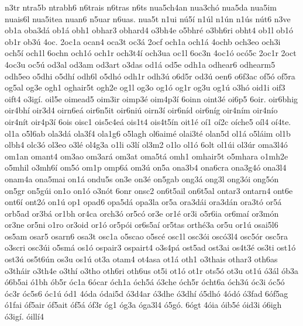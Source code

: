 {n3tr
ntra5b
ntrabh6
n6trais
n6tras
n6ts
nua5ch4an
nua3ch^^f3
nua5da
nua5im
nuais6l
nua5itea
nuan6
n5uar
n6uas.
nua5t
n1ui
n^^fa5^^ed
n1^^fal
n1^^fan
n1^^fas
n^^fat6
n3ve
ob1a
oba3d^^e1
ob1^^e1
obh1
obhar3
obhard4
o3bh4e
o5bhr^^e9
o3bh6ri
obht4
ob1l
ob1^^f3
ob1r
ob3^^fa
4oc.
2oc1a
ocan4
oca3t
oc3^^e1
2ocf
och1a
och1^^e1
4ochb
och3eo
och3i
och5^^ed
och1l
6ochn
och1^^f3
och1r
och3t4^^ed
och3ua
oc1l
6oc3n
4oc1^^f3
oc^^f35c
2oc1r
2oct
4oc3u
oc5^^fa
od3al
od3am
od3art
o3das
od1^^e1
od5e
odh1a
odhear6
odhearm5
odh5eo
o5dhi
o5dh^^ed
odh6l
o5dh^^f3
odh1r
odh3^^fa
o6d5r
od3^^fa
oen6
o6f3ac
of5^^f3
of5ra
og5al
og3e
ogh1
oghair5t
ogh2e
og1l
og3o
og1^^f3
og1r
og3u
og1^^fa
o3h^^f3
oid1i
oif3
oift4
o3ig^^ed.
oil5e
oimead5
oim3ir
oimp3^^e9
oim4p3^^ed
6oinn
oint3^^e9
oi6p5
6oir.
oir6bhig
oir4bh^^ed
oir3d4
oirn6e^^e1
oir6n5it
oir6ni^^fa
oirn3^^ed
oir6n^^edd
oir6n^^edg
oir4n^^edm
oir4n^^edo
oir4n^^edt
oir4p3^^ed
6ois
oisc1
ois5c4e^^e1
ois1t4
ois4t5^^edn
oit1^^e9
o^^ed1
o^^ed2c
o^^edche5
o^^edl4
o^^ed4te.
ol1a
o5l6ab
ola3d^^e1
ola3f4
ola1g6
o5lagh
ol6aim^^e9
olai3t^^e9
olan5d
ol1^^e1
o5l^^e1im
ol1b
olbh4
olc3^^f3
ol3eo
o3l^^e9
ol4g3a
o1li
o3l^^ed
ol3m2
o1lo
ol1^^f3
6olt
ol1^^fai
ol3^^far
oma3l4^^f3
om1an
omant4
om3ao
om3ar^^e1
om3at
oma5t^^e1
omh1
omhair5t
o5mhara
o1mh2e
o5mhil
o3mh6^^ed
om5^^f3
om1p
omp6^^e1
om3^^fa
on5a
ona3b4
ona6cra
ona3g4^^f3
ona3l4
onam4a
ona5mai
on1^^e1
ondu5s
on3e
on3^^e9
on5gab
ong3^^e1
ong3l
ong3^^f3i
ong5^^f3n
on5gr
on5g^^fai
on1o
on1^^f3
o3n^^f3t
6onr
onsc2
on6t5ail
on6t5al
ontar3
ontarn4
ont6e
ont6^^ed
ont2^^f3
on1^^fa
op1
opad6
opa5d^^e1
opa3la
or5a
ora3d^^e1i
ora3d^^e1n
ora3t^^f3
or5^^e1
orb5ad
or3b^^e1
or1bh
or4ca
orch3^^f3
or5c^^f3
or3e
or1^^e9
or3i
o5r6ia
or6ma^^ed
or3m^^f3n
or3ne
or5ni
o1ro
or3oid
or1^^f3
or5p^^f3i
or6s5a^^ed
or5tas
orth^^e93a
or5u
or1^^fa
osai5l6
os5am
osar5
osarn6
osa3t
osc1a
o5scao
o5sc^^e9
osc1l
osc3^^f3i
osc^^f33l4
osc5^^f3r
osc5ra
o3scri
osc3^^fai
o5sm^^e1
os1^^f3
ospair3
ospairt4
o3s4p^^e1
ost5ad
ost3ai
os4t3^^e9
os3ti
ost1^^f3
ost3^^fa
os5t6^^fan
os3u
os1^^fa
ot3a
otam4
ot4asa
ot1^^e1
oth1
o3thais
othar3
oth6as
o3th^^e1ir
o3th4e
o3th^^ed
o3tho
oth6ri
oth6us
ot5i
ot1^^f3
ot1r
ots5^^f3
ot3u
ot1^^fa
^^f33^^e1l
^^f3b3a
^^f36b5ai
^^f31bh
^^f3b5r
^^f3c1a
6^^f3car
^^f3ch1a
^^f3ch5^^e1
^^f33che
^^f3ch5r
^^f3cht6a
^^f3ch3^^fa
^^f3c3i
^^f3c5^^f3
^^f3c3r
^^f3c5s6
^^f3c1^^fa
^^f3d1
4^^f3da
^^f3dai5d
^^f33d4ar
^^f33dhe
^^f33dh^^ed
^^f35dh^^f3
4^^f3d^^f3
^^f33fad
6^^f3f5ag
^^f31fai
^^f3f5air
^^f3f5ait
^^f3f5^^e1
^^f3f3r
^^f3g1
^^f3g3a
^^f3ga3l4
^^f35g^^f3.
6^^f3gt
4^^f3ia
^^f3ib5^^e9
^^f3id3i
^^f36igh
^^f33ig^^ed.
^^f3ill^^ed4
}
